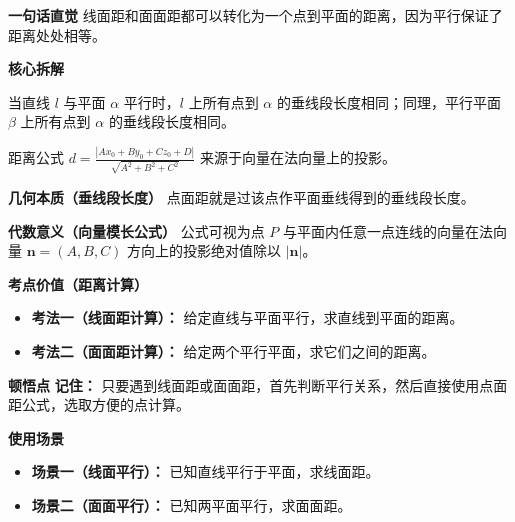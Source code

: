 \begin{explanationbox}
	\textbf{\textcolor{CExplanation}{一句话直觉}}
	线面距和面面距都可以转化为一个点到平面的距离，因为平行保证了距离处处相等。

	\medskip
	\textbf{\textcolor{CExplanation}{核心拆解}}
	\begin{description}[style=nextline, leftmargin=2.8em, labelsep=0.5em, itemsep=0.45em]
		\item[\textbf{要点一（距离不变性）：}]
			当直线 $l$ 与平面 $\alpha$ 平行时，$l$ 上所有点到 $\alpha$ 的垂线段长度相同；同理，平行平面 $\beta$ 上所有点到 $\alpha$ 的垂线段长度相同。
		\item[\textbf{要点二（投影法求距）：}]
			距离公式 $d = \frac{|Ax_0+By_0+Cz_0+D|}{\sqrt{A^2+B^2+C^2}}$ 来源于向量在法向量上的投影。
	\end{description}

	\medskip
	\textbf{\textcolor{CExplanation}{几何本质（垂线段长度）}}
	点面距就是过该点作平面垂线得到的垂线段长度。

	\medskip
	\textbf{\textcolor{CExplanation}{代数意义（向量模长公式）}}
	公式可视为点 $P$ 与平面内任意一点连线的向量在法向量 $\mathbf{n}=(A,B,C)$ 方向上的投影绝对值除以 $|\mathbf{n}|$。

	\medskip
	\textbf{\textcolor{CExplanation}{考点价值（距离计算）}}
	\begin{itemize}[leftmargin=*, itemsep=0.5em, topsep=0.4em]
		\item \textbf{考法一（线面距计算）：} 给定直线与平面平行，求直线到平面的距离。
		\item \textbf{考法二（面面距计算）：} 给定两个平行平面，求它们之间的距离。
	\end{itemize}

	\medskip
	\textbf{\textcolor{CExplanation}{顿悟点}}
	\textbf{记住：} 只要遇到线面距或面面距，首先判断平行关系，然后直接使用点面距公式，选取方便的点计算。

	\medskip
	\textbf{\textcolor{CExplanation}{使用场景}}
	\begin{itemize}[leftmargin=*, itemsep=0.5em, topsep=0.4em]
		\item \textbf{场景一（线面平行）：} 已知直线平行于平面，求线面距。
		\item \textbf{场景二（面面平行）：} 已知两平面平行，求面面距。
	\end{itemize}

\end{explanationbox}
